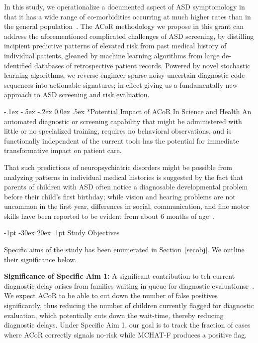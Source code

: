 \documentclass[onecolumn, compsoc,11pt]{IEEEtran}
\makeatletter
\renewcommand\section{\@startsection {section}{1}{\z@}%
                                   {-1pt \@plus -30ex \@minus 20ex}%
                                   {.1pt}%
                                   {\large\bfseries\scshape}}
\renewcommand\paragraph{\@startsection {section}{1}{\z@}%
                                   {-.1ex \@plus -.5ex \@minus -.2ex}%
                                   {0.0ex \@plus.5ex}%
                                   {\fontsize{11}{10}\selectfont\bfseries\itshape\sffamily\color{black}}}
\def\ZERO{ACoR\xspace}
\makeatother
\begin{document}
In this study, we operationalize a documented aspect of ASD symptomology in  that it has   a wide range  of co-morbidities occurring at much higher rates than in the general population~\cite{hyman2020identification}.
The \ZERO methodology we propose in this grant can address the aforementioned  complicated  challenges of ASD screening, by distilling incipient predictive patterns of  elevated risk from past medical history of individual  patients, gleaned by machine learning  algorithms from large  de-identified databases of retrospective patient records. Powered by  novel stochastic learning algorithms, we  reverse-engineer sparse noisy uncertain diagnostic code sequences into actionable signatures; in effect giving us  a fundamentally new approach to ASD screening and risk evaluation.

\paragraph*{Potential  Impact  of  \ZERO In Science and Health}
An automated   diagnostic or screening capability that might be administered with little or no specialized training, requires no behavioral observations, and is functionally independent of the current tools  has the potential for  immediate transformative  impact on patient care. 

That such  predictions  of neuropsychiatric  disorders might be possible  from analyzing patterns in individual medical histories   is suggested by the fact  that  parents of children with ASD often notice a diagnosable developmental problem before their child's first birthday; while vision and hearing problems are not uncommon in the first year,  differences in social, communication, and fine motor skills have been reported to be  evident from about 6 months of age~\cite{pmid21410398,herlihy2015parents,chawarska2013decreased}. 

\section{Study Objectives}

Specific aims of the study has been enumerated in Section~\ref{secobj}. We outline their significance below.

\textbf{Significance of Specific Aim 1:} 
A significant contribution to teh current diagnostic delay arises from families waiting in queue for diagnostic evaluationsr~\cite{gordon2016whittling}. 
We expect \ZERO to be able to cut down the number of false positives significantly, thus reducing the number of children currently flagged for diagnostic evaluation, which potentially cuts down  the wait-time, thereby reducing diagnostic delays.  Under Specific Aim 1, our goal is to track the fraction of cases where \ZERO correctly signals no-risk while MCHAT-F produces a positive flag.
\end{document}
